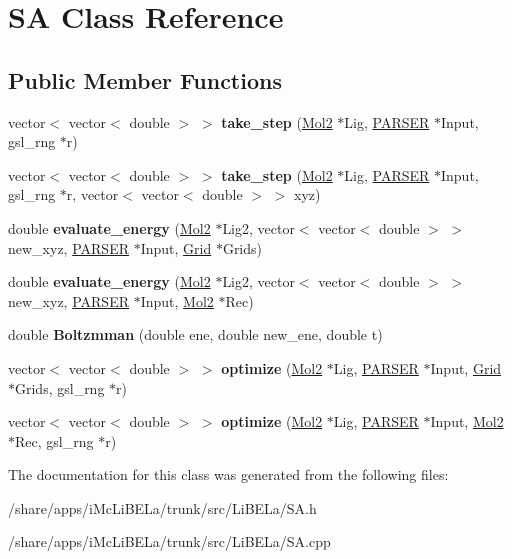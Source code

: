 \hypertarget{classSA}{
\section{SA Class Reference}
\label{classSA}
}
\subsection*{Public Member Functions}
\begin{DoxyCompactItemize}
\item 
\hypertarget{classSA_ad62a447d65a1651585cd46b9acaa0692}{
vector$<$ vector$<$ double $>$ $>$ {\bfseries take\_\-step} (\hyperlink{classMol2}{Mol2} $\ast$Lig, \hyperlink{classPARSER}{PARSER} $\ast$Input, gsl\_\-rng $\ast$r)}
\label{classSA_ad62a447d65a1651585cd46b9acaa0692}

\item 
\hypertarget{classSA_ab7a6dc36a2c897a96e8c2d447d854964}{
vector$<$ vector$<$ double $>$ $>$ {\bfseries take\_\-step} (\hyperlink{classMol2}{Mol2} $\ast$Lig, \hyperlink{classPARSER}{PARSER} $\ast$Input, gsl\_\-rng $\ast$r, vector$<$ vector$<$ double $>$ $>$ xyz)}
\label{classSA_ab7a6dc36a2c897a96e8c2d447d854964}

\item 
\hypertarget{classSA_afa06a9c3e791ebb2ed330ef4bbb9e3f6}{
double {\bfseries evaluate\_\-energy} (\hyperlink{classMol2}{Mol2} $\ast$Lig2, vector$<$ vector$<$ double $>$ $>$ new\_\-xyz, \hyperlink{classPARSER}{PARSER} $\ast$Input, \hyperlink{classGrid}{Grid} $\ast$Grids)}
\label{classSA_afa06a9c3e791ebb2ed330ef4bbb9e3f6}

\item 
\hypertarget{classSA_aba4a62625a474c153baceb0ec800e9ca}{
double {\bfseries evaluate\_\-energy} (\hyperlink{classMol2}{Mol2} $\ast$Lig2, vector$<$ vector$<$ double $>$ $>$ new\_\-xyz, \hyperlink{classPARSER}{PARSER} $\ast$Input, \hyperlink{classMol2}{Mol2} $\ast$Rec)}
\label{classSA_aba4a62625a474c153baceb0ec800e9ca}

\item 
\hypertarget{classSA_a84444c876588a51e888518e19d7c53b8}{
double {\bfseries Boltzmman} (double ene, double new\_\-ene, double t)}
\label{classSA_a84444c876588a51e888518e19d7c53b8}

\item 
\hypertarget{classSA_a187fe61713bd2d5f2067090e5b8df7d5}{
vector$<$ vector$<$ double $>$ $>$ {\bfseries optimize} (\hyperlink{classMol2}{Mol2} $\ast$Lig, \hyperlink{classPARSER}{PARSER} $\ast$Input, \hyperlink{classGrid}{Grid} $\ast$Grids, gsl\_\-rng $\ast$r)}
\label{classSA_a187fe61713bd2d5f2067090e5b8df7d5}

\item 
\hypertarget{classSA_a944a30a42145d30925a318256f54e95b}{
vector$<$ vector$<$ double $>$ $>$ {\bfseries optimize} (\hyperlink{classMol2}{Mol2} $\ast$Lig, \hyperlink{classPARSER}{PARSER} $\ast$Input, \hyperlink{classMol2}{Mol2} $\ast$Rec, gsl\_\-rng $\ast$r)}
\label{classSA_a944a30a42145d30925a318256f54e95b}

\end{DoxyCompactItemize}


The documentation for this class was generated from the following files:\begin{DoxyCompactItemize}
\item 
/share/apps/iMcLiBELa/trunk/src/LiBELa/SA.h\item 
/share/apps/iMcLiBELa/trunk/src/LiBELa/SA.cpp\end{DoxyCompactItemize}
